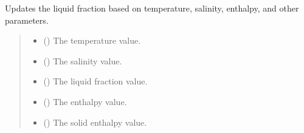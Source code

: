 \documentclass[a4paper,11pt,english,openany]{sphinxmanual}
\begin{document}
\begin{fulllineitems}
\label{\detokenize{api/spyice.update_physical_values:src.spyice.update_physical_values.update_liquid_fraction_voller_continuous_thermal_properties}}
\pysigstartsignatures
\pysiglinewithargsret
{}
{\sphinxparamcomma {}\sphinxparamcomma {}\sphinxparamcomma {}\sphinxparamcomma {}\sphinxparamcomma {}\sphinxparamcomma {}\sphinxparamcomma {}\sphinxparamcomma {}}
{}
\pysigstopsignatures
\sphinxAtStartPar
Updates the liquid fraction based on temperature, salinity, enthalpy, and other parameters.
\begin{quote}\begin{description}
\begin{itemize}
\item {} 
\sphinxAtStartPar
{} () \textendash{} The temperature value.

\item {} 
\sphinxAtStartPar
{} () \textendash{} The salinity value.

\item {} 
\sphinxAtStartPar
{} () \textendash{} The liquid fraction value.

\item {} 
\sphinxAtStartPar
{} () \textendash{} The enthalpy value.

\item {} 
\sphinxAtStartPar
{} () \textendash{} The solid enthalpy value.


\end{itemize}
\end{description}
\end{quote}
\end{fulllineitems}
\end{document}
